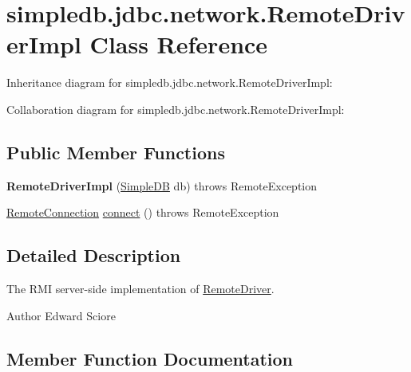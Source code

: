 \hypertarget{classsimpledb_1_1jdbc_1_1network_1_1RemoteDriverImpl}{}\section{simpledb.\+jdbc.\+network.\+Remote\+Driver\+Impl Class Reference}
\label{classsimpledb_1_1jdbc_1_1network_1_1RemoteDriverImpl}


Inheritance diagram for simpledb.\+jdbc.\+network.\+Remote\+Driver\+Impl\+:


Collaboration diagram for simpledb.\+jdbc.\+network.\+Remote\+Driver\+Impl\+:
\subsection*{Public Member Functions}
\begin{DoxyCompactItemize}
\item 
\mbox{\label{classsimpledb_1_1jdbc_1_1network_1_1RemoteDriverImpl_a09510d1695ed9969a240b25be045598a}} 
{\bfseries Remote\+Driver\+Impl} (\hyperlink{classsimpledb_1_1server_1_1SimpleDB}{Simple\+DB} db)  throws Remote\+Exception 
\item 
\hyperlink{interfacesimpledb_1_1jdbc_1_1network_1_1RemoteConnection}{Remote\+Connection} \hyperlink{classsimpledb_1_1jdbc_1_1network_1_1RemoteDriverImpl_a7a8007941ecbe468f4af2379942ddce1}{connect} ()  throws Remote\+Exception 
\end{DoxyCompactItemize}


\subsection{Detailed Description}
The R\+MI server-\/side implementation of \hyperlink{interfacesimpledb_1_1jdbc_1_1network_1_1RemoteDriver}{Remote\+Driver}. \begin{DoxyAuthor}{Author}
Edward Sciore 
\end{DoxyAuthor}


\subsection{Member Function Documentation}
\mbox{\label{classsimpledb_1_1jdbc_1_1network_1_1RemoteDriverImpl_a7a8007941ecbe468f4af2379942ddce1}} 
